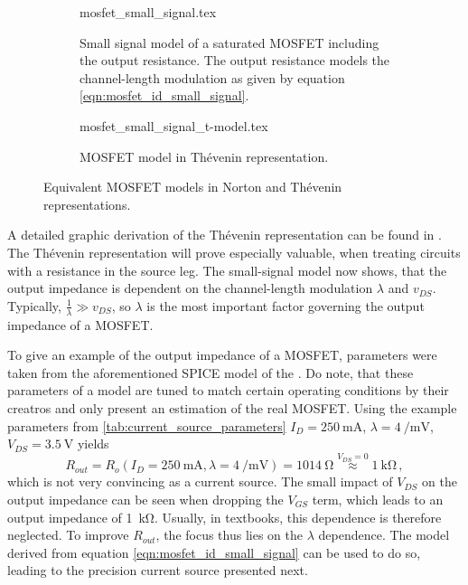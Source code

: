 \begin{figure}[hb]
    \centering
    \begin{subfigure}{0.4\linewidth}
        \centering
        {mosfet_small_signal.tex}
        \caption{Small signal model of a saturated MOSFET including the output resistance. The output resistance models the channel-length modulation as given by equation \ref{eqn:mosfet_id_small_signal}.}
        \label{fig:mostfet_small_signa_model_model_norton}
    \end{subfigure}
    \begin{subfigure}{0.4\linewidth}
        \centering
        {mosfet_small_signal_t-model.tex}
        \caption{MOSFET model in Thévenin representation.}
        \label{fig:mostfet_small_signa_model_thevenin}
    \end{subfigure}
    \caption{Equivalent MOSFET models in Norton and Thévenin representations.}
    \label{fig:mostfet_small_signa_model}
\end{figure}

A detailed graphic derivation of the Thévenin representation can be found in \cite{fet_equations}. The Thévenin representation will prove especially valuable, when treating circuits with a resistance in the source leg.
The small-signal model now shows, that the output impedance is dependent on the channel-length modulation $\lambda$ and $v_{DS}$. Typically, $\frac{1}{\lambda} \gg v_{DS}$, so $\lambda$ is the most important factor governing the output impedance of a MOSFET.

To give an example of the output impedance of a MOSFET, parameters were taken from the aforementioned SPICE model of the . Do note, that these parameters of a model are tuned to match certain operating conditions by their creatros and only present an estimation of the real MOSFET. Using the example parameters from \ref{tab:current_source_parameters} $I_D=\qty{250}{\mA}$, $\lambda = \qty[per-mode=power]{4}{\per \milli \volt}$, $V_{DS}=\qty{3.5}{\V}$ yields
\begin{equation}
    R_{out} = R_{o}\left(I_D=\qty{250}{\mA}, \lambda = \qty[per-mode=power]{4}{\per \milli \volt}\right) = \qty{1014}{\ohm} \overset{V_{DS} = 0}{\approx} \qty{1}{\kilo \ohm} \, , \label{eqn:mosfet_rout_irf9610}
\end{equation}
which is not very convincing as a current source. The small impact of $V_{DS}$ on the output impedance can be seen when dropping the $V_{GS}$ term, which leads to an output impedance of \qty{1}{\kilo \ohm}. Usually, in textbooks, this dependence is therefore neglected. To improve $R_{out}$, the focus thus lies on the $\lambda$ dependence. The model derived from equation \ref{eqn:mosfet_id_small_signal} can be used to do so, leading to the precision current source presented next.

